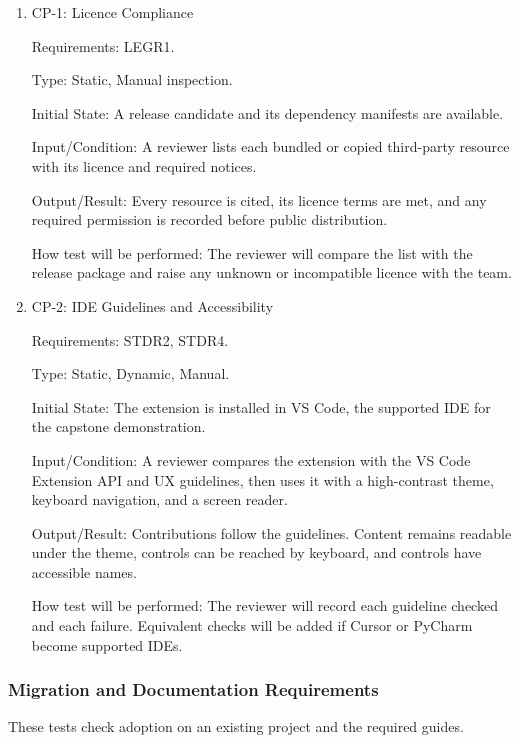 \documentclass[12pt, titlepage]{article}
\begin{document}
\begin{enumerate}

\item{CP-1: Licence Compliance\\}

Requirements: LEGR1.

Type: Static, Manual inspection.

Initial State: A release candidate and its dependency manifests are available.

Input/Condition: A reviewer lists each bundled or copied third-party resource with its
licence and required notices.

Output/Result: Every resource is cited, its licence terms are met, and any required
permission is recorded before public distribution.

How test will be performed: The reviewer will compare the list with the release package
and raise any unknown or incompatible licence with the team.

\item{CP-2: IDE Guidelines and Accessibility\\}

Requirements: STDR2, STDR4.

Type: Static, Dynamic, Manual.

Initial State: The extension is installed in VS Code, the supported IDE for the capstone
demonstration.

Input/Condition: A reviewer compares the extension with the VS Code Extension API and UX
guidelines, then uses it with a high-contrast theme, keyboard navigation, and a screen
reader.

Output/Result: Contributions follow the guidelines. Content remains readable under the
theme, controls can be reached by keyboard, and controls have accessible names.

How test will be performed: The reviewer will record each guideline checked and each
failure. Equivalent checks will be added if Cursor or PyCharm become supported IDEs.

\end{enumerate}

\subsubsection{Migration and Documentation Requirements}

These tests check adoption on an existing project and the required guides.
\end{document}
